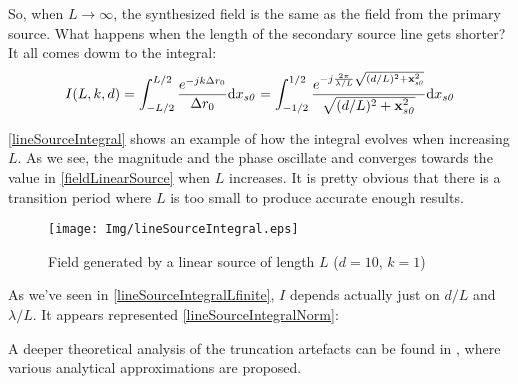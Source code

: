 So, when $L \to \infty$, the synthesized field is the same as the field from the primary source. What happens when the length of the secondary source line gets shorter? It all comes dowm to the integral:
\begin{equation}
I(L, k, d) = \int_{-L/2}^{L/2} \frac{e^{-jk\distLinePoint}}{\distLinePoint} \mathrm{d}x_{\PosTheoSubInd[section]} = \int_{-1/2}^{1/2} \frac{e^{-j\frac{2\pi}{\lambda/L}\sqrt{(d/L)^2 + \PosTheo[section]^2}}}{\sqrt{(d/L)^2 + \PosTheo[section]^2}} \mathrm{d}x_{\PosTheoSubInd[section]}
\label{lineSourceIntegralLfinite}
\end{equation}

\autoref{lineSourceIntegral} shows an example of how the integral evolves when increasing $L$. As we see, the magnitude and the phase oscillate and converges towards the value in \autoref{fieldLinearSource} when $L$ increases. It is pretty obvious that there is a transition period where $L$ is too small to produce accurate enough results.

\begin{figure}[h]
	\centering
	\texttt{[image: Img/lineSourceIntegral.eps]}
	\caption{Field generated by a linear source of length $L$ ($d = 10$, $k = 1$)}
	\label{lineSourceIntegral}
\end{figure}

As we've seen in \autoref{lineSourceIntegralLfinite}, $I$ depends actually just on $d/L$ and $\lambda/L$. It appears represented \autoref{lineSourceIntegralNorm}:



A deeper theoretical analysis of the truncation artefacts can be found in \cite[Section 4.3]{Start1997}, where various analytical approximations are proposed.